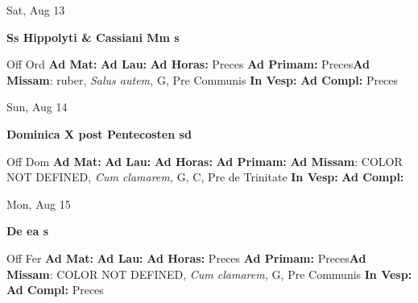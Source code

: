 \documentclass[10pt]{memoir}
\begin{document}
\begin{center}
\begin{minipage}{3.5in}
\vspace{2em}
\begin{center}Sat, Aug 13
\end{center}
\textbf{ \large Ss Hippolyti \& Cassiani Mm
\textnormal{\normalsize s}}

\begin{justify}Off Ord
\textbf{Ad Mat: }
\textbf{Ad Lau: }
\textbf{Ad Horas: }Preces
\textbf{Ad Primam: }Preces\textbf{Ad Missam}: ruber, \textit{Salus autem,} G, Pre Communis
\textbf{In Vesp: }
\textbf{Ad Compl: }Preces
\end{justify}
\end{minipage}
\end{center}

\begin{center}
\begin{minipage}{3.5in}
\vspace{2em}
\begin{center}Sun, Aug 14
\end{center}
\textbf{ \large Dominica X post Pentecosten
\textnormal{\normalsize sd}}

\begin{justify}Off Dom
\textbf{Ad Mat: }
\textbf{Ad Lau: }
\textbf{Ad Horas: }
\textbf{Ad Primam: }\textbf{Ad Missam}: COLOR NOT DEFINED, \textit{Cum clamarem,} G, C, Pre de Trinitate
\textbf{In Vesp: }
\textbf{Ad Compl: }
\end{justify}
\end{minipage}
\end{center}

\begin{center}
\begin{minipage}{3.5in}
\vspace{2em}
\begin{center}Mon, Aug 15
\end{center}
\textbf{ \large De ea
\textnormal{\normalsize s}}

\begin{justify}Off Fer
\textbf{Ad Mat: }
\textbf{Ad Lau: }
\textbf{Ad Horas: }Preces
\textbf{Ad Primam: }Preces\textbf{Ad Missam}: COLOR NOT DEFINED, \textit{Cum clamarem,} G, Pre Communis
\textbf{In Vesp: }
\textbf{Ad Compl: }Preces
\end{justify}
\end{minipage}
\end{center}
\end{document}
